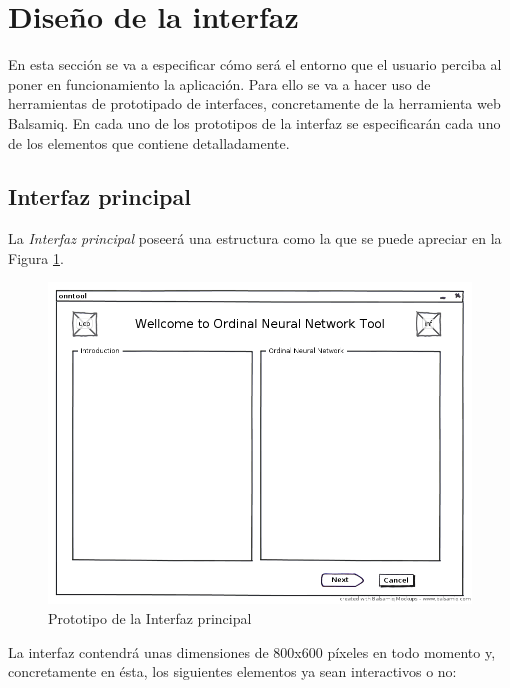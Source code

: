 	\section{Diseño de la interfaz}
		
		En esta sección se va a especificar cómo será el entorno que el usuario perciba al poner en funcionamiento la aplicación. Para ello se va a hacer uso de herramientas de prototipado de interfaces, concretamente de la herramienta web Balsamiq. En cada uno de los prototipos de la interfaz se especificarán cada uno de los elementos que contiene detalladamente.
		
		\subsection{Interfaz principal}
			
			La \textit{Interfaz principal} poseerá una estructura como la que se puede apreciar en la Figura \ref{fig:int0}.\\
			
			\begin{figure}[htbp]
				\centering
				\includegraphics[scale=0.5]{interfaz/Interfaz_principal.png}
				\caption{Prototipo de la Interfaz principal}
				\label{fig:int0}
			\end{figure}
			
			La interfaz contendrá unas dimensiones de 800x600 píxeles en todo momento y, concretamente en ésta, los siguientes elementos ya sean interactivos o no:
			
